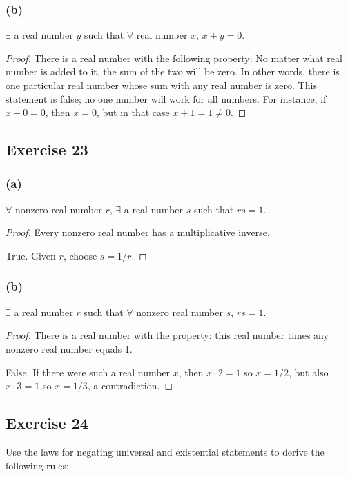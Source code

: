 \documentclass[14pt]{extarticle}
\newcommand{\fa}{\forall}
\newcommand{\te}{\exists}
\begin{document}
\subsubsection{(b)}
$\te$ a real number $y$ such that $\fa$ real number $x$, $x + y = 0$.

\begin{proof}
    There is a real number with the following property: No matter what real number is added to it, the sum of the two will be zero. In other words, there is one particular real number whose sum with any real number is zero. This statement is false; no one number will work for all numbers. For instance, if $x + 0 = 0$, then $x = 0$, but in that case $x + 1 = 1 \neq 0$.
\end{proof}

\subsection{Exercise 23}
\subsubsection{(a)}
$\fa$ nonzero real number $r$, $\te$ a real number $s$ such that $rs = 1$.

\begin{proof}
    Every nonzero real number has a multiplicative inverse.

    True. Given $r$, choose $s = 1/r$.
\end{proof}

\subsubsection{(b)}
$\te$ a real number $r$ such that $\fa$ nonzero real number $s$, $rs = 1$.

\begin{proof}
    There is a real number with the property: this real number times any nonzero real number equals 1.

    False. If there were such a real number $x$, then $x \cdot 2 = 1$ so $x = 1/2$, but also $x \cdot 3 = 1$ so $x = 1/3$, a contradiction.
\end{proof}

\subsection{Exercise 24}
Use the laws for negating universal and existential statements to derive the following rules:
\end{document}
